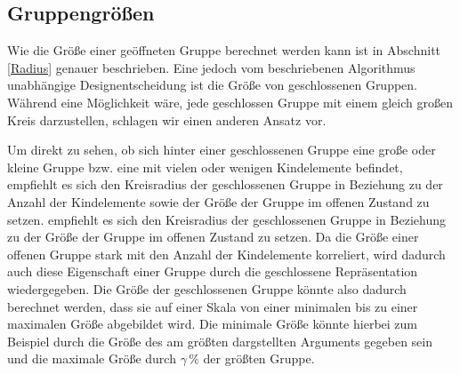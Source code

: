 \subsection*{Gruppengrößen}
Wie die Größe einer geöffneten Gruppe berechnet werden kann ist in Abschnitt \ref{Radius} genauer beschrieben. 
Eine jedoch vom beschriebenen Algorithmus unabhängige Designentscheidung ist die Größe von geschlossenen Gruppen.
Während eine Möglichkeit wäre, jede geschlossen Gruppe mit einem gleich großen Kreis darzustellen, schlagen wir einen anderen Ansatz vor.

Um direkt zu sehen, ob sich hinter einer geschlossenen Gruppe eine große oder kleine Gruppe bzw. eine mit vielen oder wenigen Kindelemente befindet, 
empfiehlt es sich den Kreisradius der geschlossenen Gruppe in Beziehung zu der Anzahl der Kindelemente sowie der Größe der Gruppe im offenen Zustand zu setzen.
empfiehlt es sich den Kreisradius der geschlossenen Gruppe in Beziehung zu der Größe der Gruppe im offenen Zustand zu setzen.
Da die Größe einer offenen Gruppe stark mit den Anzahl der Kindelemente korreliert, wird dadurch auch diese Eigenschaft einer Gruppe durch die geschlossene Repräsentation
wiedergegeben.
Die Größe der geschlossenen Gruppe könnte also dadurch berechnet werden, dass sie auf einer Skala von einer minimalen bis zu einer maximalen Größe abgebildet wird.
Die minimale Größe könnte hierbei zum Beispiel durch die Größe des am größten dargstellten Arguments gegeben sein und die maximale Größe durch $\gamma \,\%$ der größten Gruppe.

